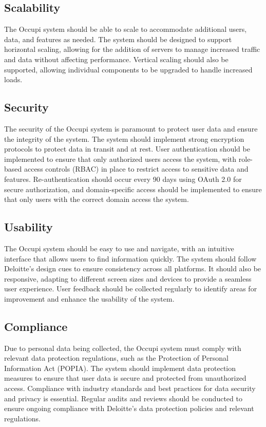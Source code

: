 \documentclass[11pt,a4paper]{article}
\begin{document}
\subsection*{Scalability}
The Occupi system should be able to scale to accommodate additional users, data, and features as needed. The system should be designed to support horizontal scaling, allowing for the addition of servers to manage increased traffic and data without affecting performance. Vertical scaling should also be supported, allowing individual components to be upgraded to handle increased loads.

\subsection*{Security}
The security of the Occupi system is paramount to protect user data and ensure the integrity of the system. The system should implement strong encryption protocols to protect data in transit and at rest. User authentication should be implemented to ensure that only authorized users access the system, with role-based access controls (RBAC) in place to restrict access to sensitive data and features. Re-authentication should occur every 90 days using OAuth 2.0 for secure authorization, and domain-specific access should be implemented to ensure that only users with the correct domain access the system.

\subsection*{Usability}
The Occupi system should be easy to use and navigate, with an intuitive interface that allows users to find information quickly. The system should follow Deloitte's design cues to ensure consistency across all platforms. It should also be responsive, adapting to different screen sizes and devices to provide a seamless user experience. User feedback should be collected regularly to identify areas for improvement and enhance the usability of the system.

\subsection*{Compliance}
Due to personal data being collected, the Occupi system must comply with relevant data protection regulations, such as the Protection of Personal Information Act (POPIA). The system should implement data protection measures to ensure that user data is secure and protected from unauthorized access. Compliance with industry standards and best practices for data security and privacy is essential. Regular audits and reviews should be conducted to ensure ongoing compliance with Deloitte’s data protection policies and relevant regulations.
\end{document}
